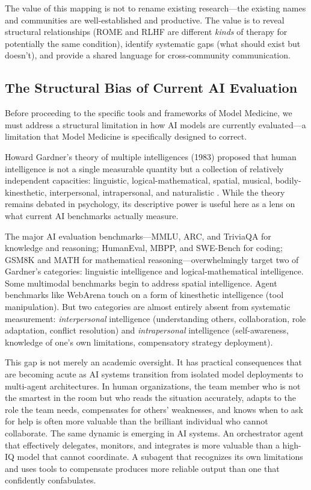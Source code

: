 \documentclass[11pt]{article}
\begin{document}
The value of this mapping is not to rename existing research---the existing names and communities are well-established and productive. The value is to reveal structural relationships (ROME and RLHF are different \emph{kinds} of therapy for potentially the same condition), identify systematic gaps (what should exist but doesn't), and provide a shared language for cross-community communication.

\subsection{The Structural Bias of Current AI Evaluation}

Before proceeding to the specific tools and frameworks of Model Medicine, we must address a structural limitation in how AI models are currently evaluated---a limitation that Model Medicine is specifically designed to correct.

Howard Gardner's theory of multiple intelligences (1983) proposed that human intelligence is not a single measurable quantity but a collection of relatively independent capacities: linguistic, logical-mathematical, spatial, musical, bodily-kinesthetic, interpersonal, intrapersonal, and naturalistic \citep{Gardner1983}. While the theory remains debated in psychology, its descriptive power is useful here as a lens on what current AI benchmarks actually measure.

The major AI evaluation benchmarks---MMLU, ARC, and TriviaQA for knowledge and reasoning; HumanEval, MBPP, and SWE-Bench for coding; GSM8K and MATH for mathematical reasoning---overwhelmingly target two of Gardner's categories: linguistic intelligence and logical-mathematical intelligence. Some multimodal benchmarks begin to address spatial intelligence. Agent benchmarks like WebArena touch on a form of kinesthetic intelligence (tool manipulation). But two categories are almost entirely absent from systematic measurement: \emph{interpersonal} intelligence (understanding others, collaboration, role adaptation, conflict resolution) and \emph{intrapersonal} intelligence (self-awareness, knowledge of one's own limitations, compensatory strategy deployment).

This gap is not merely an academic oversight. It has practical consequences that are becoming acute as AI systems transition from isolated model deployments to multi-agent architectures. In human organizations, the team member who is not the smartest in the room but who reads the situation accurately, adapts to the role the team needs, compensates for others' weaknesses, and knows when to ask for help is often more valuable than the brilliant individual who cannot collaborate. The same dynamic is emerging in AI systems. An orchestrator agent that effectively delegates, monitors, and integrates is more valuable than a high-IQ model that cannot coordinate. A subagent that recognizes its own limitations and uses tools to compensate produces more reliable output than one that confidently confabulates.
\end{document}
